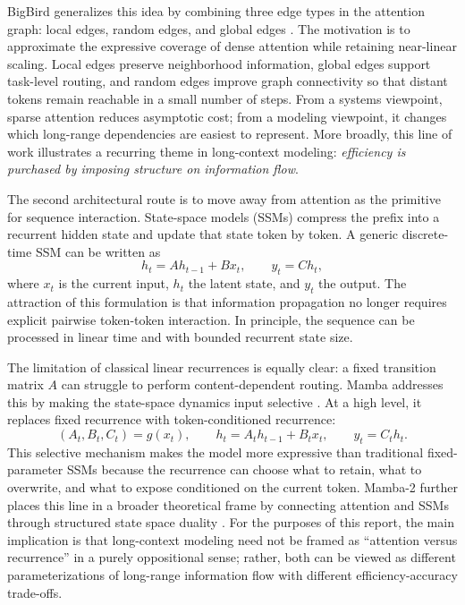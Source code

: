 \documentclass[11pt]{article}
\begin{document}
BigBird generalizes this idea by combining three edge types in the attention graph: local edges, random edges, and global edges \citep{zaheer2020bigbird}. The motivation is to approximate the expressive coverage of dense attention while retaining near-linear scaling. Local edges preserve neighborhood information, global edges support task-level routing, and random edges improve graph connectivity so that distant tokens remain reachable in a small number of steps. From a systems viewpoint, sparse attention reduces asymptotic cost; from a modeling viewpoint, it changes which long-range dependencies are easiest to represent. More broadly, this line of work illustrates a recurring theme in long-context modeling: \emph{efficiency is purchased by imposing structure on information flow}.

The second architectural route is to move away from attention as the primitive for sequence interaction. State-space models (SSMs) compress the prefix into a recurrent hidden state and update that state token by token. A generic discrete-time SSM can be written as
\begin{equation}
h_t = A h_{t-1} + B x_t,\qquad y_t = C h_t,
\end{equation}
where $x_t$ is the current input, $h_t$ the latent state, and $y_t$ the output. The attraction of this formulation is that information propagation no longer requires explicit pairwise token-token interaction. In principle, the sequence can be processed in linear time and with bounded recurrent state size.

The limitation of classical linear recurrences is equally clear: a fixed transition matrix $A$ can struggle to perform content-dependent routing. Mamba addresses this by making the state-space dynamics input selective \citep{gu2023mamba}. At a high level, it replaces fixed recurrence with token-conditioned recurrence:
\begin{equation}
(A_t,B_t,C_t)=g(x_t),\qquad
h_t=A_t h_{t-1}+B_t x_t,\qquad
y_t=C_t h_t.
\end{equation}
This selective mechanism makes the model more expressive than traditional fixed-parameter SSMs because the recurrence can choose what to retain, what to overwrite, and what to expose conditioned on the current token. Mamba-2 further places this line in a broader theoretical frame by connecting attention and SSMs through structured state space duality \citep{dao2024mamba2}. For the purposes of this report, the main implication is that long-context modeling need not be framed as ``attention versus recurrence'' in a purely oppositional sense; rather, both can be viewed as different parameterizations of long-range information flow with different efficiency-accuracy trade-offs.
\end{document}
